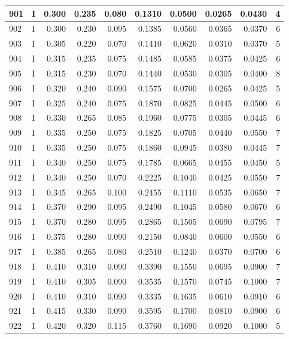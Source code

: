 \documentclass[9pt,twocolumn,twoside,]{pnas-new}
\begin{document}
\begin{tabular}{l|l|r|r|r|r|r|r|r|r}
\hline
901 & I & 0.300 & 0.235 & 0.080 & 0.1310 & 0.0500 & 0.0265 & 0.0430 & 4\\
\hline
902 & I & 0.300 & 0.230 & 0.095 & 0.1385 & 0.0560 & 0.0365 & 0.0370 & 6\\
\hline
903 & I & 0.305 & 0.220 & 0.070 & 0.1410 & 0.0620 & 0.0310 & 0.0370 & 5\\
\hline
904 & I & 0.315 & 0.235 & 0.075 & 0.1485 & 0.0585 & 0.0375 & 0.0425 & 6\\
\hline
905 & I & 0.315 & 0.230 & 0.070 & 0.1440 & 0.0530 & 0.0305 & 0.0400 & 8\\
\hline
906 & I & 0.320 & 0.240 & 0.090 & 0.1575 & 0.0700 & 0.0265 & 0.0425 & 5\\
\hline
907 & I & 0.325 & 0.240 & 0.075 & 0.1870 & 0.0825 & 0.0445 & 0.0500 & 6\\
\hline
908 & I & 0.330 & 0.265 & 0.085 & 0.1960 & 0.0775 & 0.0305 & 0.0445 & 6\\
\hline
909 & I & 0.335 & 0.250 & 0.075 & 0.1825 & 0.0705 & 0.0440 & 0.0550 & 7\\
\hline
910 & I & 0.335 & 0.250 & 0.075 & 0.1860 & 0.0945 & 0.0380 & 0.0445 & 7\\
\hline
911 & I & 0.340 & 0.250 & 0.075 & 0.1785 & 0.0665 & 0.0455 & 0.0450 & 5\\
\hline
912 & I & 0.340 & 0.250 & 0.070 & 0.2225 & 0.1040 & 0.0425 & 0.0550 & 7\\
\hline
913 & I & 0.345 & 0.265 & 0.100 & 0.2455 & 0.1110 & 0.0535 & 0.0650 & 7\\
\hline
914 & I & 0.370 & 0.290 & 0.095 & 0.2490 & 0.1045 & 0.0580 & 0.0670 & 6\\
\hline
915 & I & 0.370 & 0.280 & 0.095 & 0.2865 & 0.1505 & 0.0690 & 0.0795 & 7\\
\hline
916 & I & 0.375 & 0.280 & 0.090 & 0.2150 & 0.0840 & 0.0600 & 0.0550 & 6\\
\hline
917 & I & 0.385 & 0.265 & 0.080 & 0.2510 & 0.1240 & 0.0370 & 0.0700 & 6\\
\hline
918 & I & 0.410 & 0.310 & 0.090 & 0.3390 & 0.1550 & 0.0695 & 0.0900 & 7\\
\hline
919 & I & 0.410 & 0.305 & 0.090 & 0.3535 & 0.1570 & 0.0745 & 0.1000 & 7\\
\hline
920 & I & 0.410 & 0.310 & 0.090 & 0.3335 & 0.1635 & 0.0610 & 0.0910 & 6\\
\hline
921 & I & 0.415 & 0.330 & 0.090 & 0.3595 & 0.1700 & 0.0810 & 0.0900 & 6\\
\hline
922 & I & 0.420 & 0.320 & 0.115 & 0.3760 & 0.1690 & 0.0920 & 0.1000 & 5\\

\end{tabular}
\end{document}

